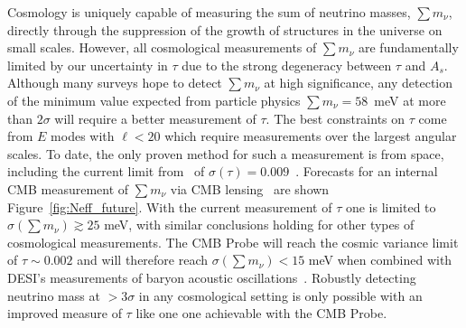 Cosmology is uniquely capable of measuring the sum of neutrino masses, $\sum m_\nu$, directly through the 
suppression of the growth of structures in the universe on small scales.   However, all cosmological measurements of $\sum m_\nu$ are fundamentally limited by our uncertainty in $\tau$ due to the strong degeneracy between $\tau$ and $A_s$.  Although many surveys hope to detect $\sum m_\nu$ at high significance, any detection of the minimum value expected from particle physics  
$\sum m_\nu = 58$~meV at more than $2 \sigma$ will require a better measurement of $\tau$.  The best constraints on $\tau$ come from $E$ modes with $\ell < 20$ which require 
measurements over the largest angular scales.
To date, the only proven method for such a measurement is from space, including the current limit  from \planck\ of $\sigma({\tau}) = 0.009$~\cite{planck2016_xlvi}.  Forecasts for an internal 
CMB measurement of $\sum m_\nu$ via CMB lensing~\cite{Kaplinghat:2003bh} are shown Figure~\ref{fig:Neff_future}.  With the current measurement of $\tau$ one is limited to  
$\sigma(\sum m_\nu) \gtrsim 25$ meV, with similar conclusions holding for other types of cosmological measurements.  The \ac{CMB} Probe will reach the cosmic variance limit of $\tau \sim 0.002$ and will therefore 
reach $\sigma(\sum m_\nu) < 15$ meV when combined with DESI's measurements of 
baryon acoustic oscillations~\cite{Levi:2013gra}.  Robustly detecting neutrino mass at  $> 3\sigma$ in any cosmological setting is only possible with an improved measure of $\tau$ like one one achievable with the \ac{CMB} Probe.



